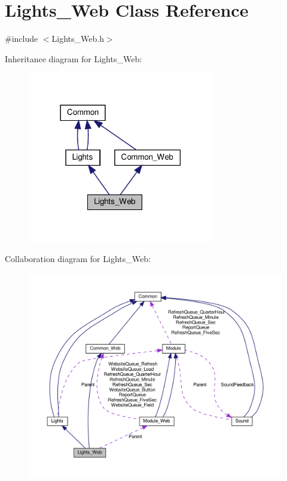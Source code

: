 \hypertarget{class_lights___web}{}\section{Lights\+\_\+\+Web Class Reference}
\label{class_lights___web}


{\ttfamily \#include $<$Lights\+\_\+\+Web.\+h$>$}



Inheritance diagram for Lights\+\_\+\+Web\+:
\nopagebreak
\begin{figure}[H]
\begin{center}
\leavevmode
\includegraphics[width=230pt]{class_lights___web__inherit__graph}
\end{center}
\end{figure}


Collaboration diagram for Lights\+\_\+\+Web\+:
\nopagebreak
\begin{figure}[H]
\begin{center}
\leavevmode
\includegraphics[width=350pt]{class_lights___web__coll__graph}
\end{center}
\end{figure}
